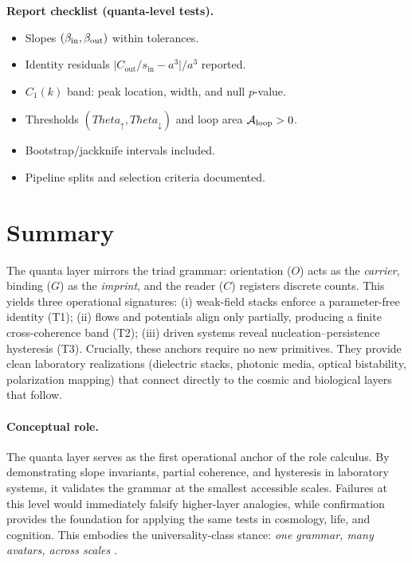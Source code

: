 \documentclass[12pt,a4paper,oneside]{scrreprt}
\def\Theta{Theta}%
\newenvironment{checklist}{%
  \begin{itemize}[label=\checkmark,leftmargin=2em]
}{%
  \end{itemize}
}
\begin{document}
\begin{checklist}
\textbf{Report checklist (quanta-level tests).}
\begin{itemize}
  \item Slopes $(\beta_{\rm in}, \beta_{\rm out})$ within tolerances. 
  \item Identity residuals $\big| C_{\mathrm{out}}/s_{\mathrm{in}} - a^3 \big| / a^3$ reported.
  \item $C_1(k)$ band: peak location, width, and null $p$-value.
  \item Thresholds $(\Theta_\uparrow, \Theta_\downarrow)$ and loop area $\mathcal A_{\rm loop} > 0$.
  \item Bootstrap/jackknife intervals included.
  \item Pipeline splits and selection criteria documented.
\end{itemize}
\end{checklist}

\section*{Summary}

The quanta layer mirrors the triad grammar: orientation ($O$) acts as the 
\emph{carrier}, binding ($G$) as the \emph{imprint}, and the reader ($C$) 
registers discrete counts. 
This yields three operational signatures: 
(i) weak-field stacks enforce a parameter-free identity (T1); 
(ii) flows and potentials align only partially, producing a finite cross-coherence 
band (T2); 
(iii) driven systems reveal nucleation–persistence hysteresis (T3). 
Crucially, these anchors require no new primitives. 
They provide clean laboratory realizations (dielectric stacks, photonic media, 
optical bistability, polarization mapping) that connect directly to the 
cosmic and biological layers that follow. 

\paragraph{Conceptual role.} 
The quanta layer serves as the first operational anchor of the role calculus. 
By demonstrating slope invariants, partial coherence, and hysteresis in laboratory 
systems, it validates the grammar at the smallest accessible scales. 
Failures at this level would immediately falsify higher-layer analogies, 
while confirmation provides the foundation for applying the same tests in 
cosmology, life, and cognition. 
This embodies the universality-class stance: 
\emph{one grammar, many avatars, across scales} \citep{Stanley1971Phase,Eigen1971}.
\end{document}
